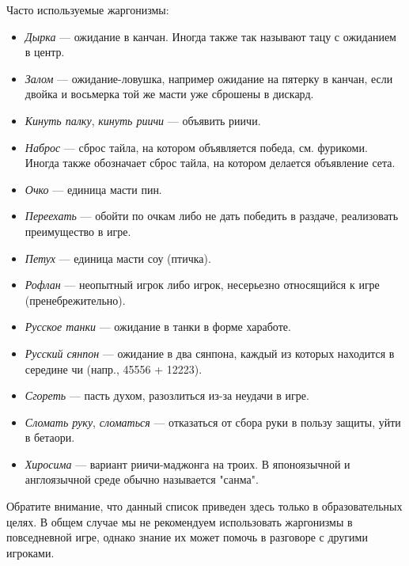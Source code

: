 Часто используемые жаргонизмы:
\begin{itemize}
	\item \textit{Дырка} --- ожидание в канчан. Иногда также так называют тацу с ожиданием в центр.
	\item \textit{Залом} --- ожидание-ловушка, например ожидание на пятерку в канчан, если двойка и восьмерка той же масти уже сброшены в дискард.
	\item \textit{Кинуть палку}, \textit{кинуть риичи} --- объявить риичи.
	\item \textit{Наброс} --- сброс тайла, на котором объявляется победа, см. фурикоми. Иногда также обозначает сброс тайла, на котором делается объявление сета.
	\item \textit{Очко} --- единица масти пин.
	\item \textit{Переехать} --- обойти по очкам либо не дать победить в раздаче, реализовать преимущество в игре.
	\item \textit{Петух} --- единица масти соу (птичка).
	\item \textit{Рофлан} --- неопытный игрок либо игрок, несерьезно относящийся к игре (пренебрежительно).
	\item \textit{Русское танки} --- ожидание в танки в форме хаработе.
	\item \textit{Русский сянпон} --- ожидание в два сянпона, каждый из которых находится в середине чи (напр., 45556 + 12223).
	\item \textit{Сгореть} --- пасть духом, разозлиться из-за неудачи в игре.
	\item \textit{Сломать руку}, \textit{сломаться} --- отказаться от сбора руки в пользу защиты, уйти в бетаори.
	\item \textit{Хиросима} --- вариант риичи-маджонга на троих. В японоязычной и англоязычной среде обычно называется "санма".
\end{itemize}
	
Обратите внимание, что данный список приведен здесь только в образовательных целях. В общем случае мы не рекомендуем использовать жаргонизмы в повседневной игре, однако знание их может помочь в разговоре с другими игроками.
